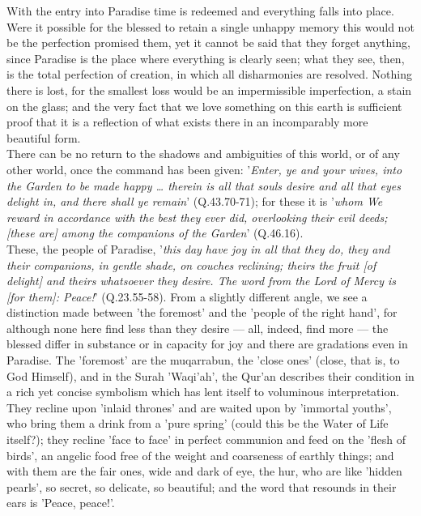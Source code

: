 \documentclass[10pt, twoside,openright]{book}
\begin{document}
With the entry into Paradise time is redeemed and everything falls into place. Were it possible for 
the blessed to retain a single unhappy memory this would not be the perfection promised them, yet it 
cannot be said that they forget anything, since Paradise is the place where everything is clearly 
seen; what they see, then, is the total perfection of creation, in which all disharmonies are 
resolved. Nothing there is lost, for the smallest loss would be an impermissible imperfection, a 
stain on the glass; and the very fact that we love something on this earth is sufficient proof that 
it is a reflection of what exists there in an incomparably more beautiful form. \\

There can be no return to the shadows and ambiguities of this world, or of any other world, once the 
command has been given: '\emph{Enter, ye and your wives, into the Garden to be made happy \ldots{} therein is 
all that souls desire and all that eyes delight in, and there shall ye remain}' (Q.43.70\hyp{}71); for 
these it is '\emph{whom We reward in accordance with the best they ever did, overlooking their evil deeds; 
[these are] among the companions of the Garden}' (Q.46.16). \\

These, the people of Paradise, '\emph{this day have joy in all that they do, they and their companions, in 
gentle shade, on couches reclining; theirs the fruit [of delight] and theirs whatsoever they desire. 
The word from the Lord of Mercy is [for them]: Peace!}' (Q.23.55\hyp{}58). From a slightly different angle, 
we see a distinction made between 'the foremost' and the 'people of the right hand', for although 
none here find less than they desire --- all, indeed, find more --- the blessed differ in substance or in 
capacity for joy and there are gradations even in Paradise. The 'foremost' are the muqarrabun, the 
'close ones' (close, that is, to God Himself), and in the Surah 'Waqi'ah', the Qur'an describes their 
condition in a rich yet concise symbolism which has lent itself to voluminous interpretation. They 
recline upon 'inlaid thrones' and are waited upon by 'immortal youths', who bring them a drink from a 
'pure spring' (could this be the Water of Life itself?); they recline 'face to face' in perfect 
communion and feed on the 'flesh of birds', an angelic food free of the weight and coarseness of 
earthly things; and with them are the fair ones, wide and dark of eye, the hur, who are like 'hidden 
pearls', so secret, so delicate, so beautiful; and the word that resounds in their ears is 'Peace, 
peace!'. \\
\end{document}
